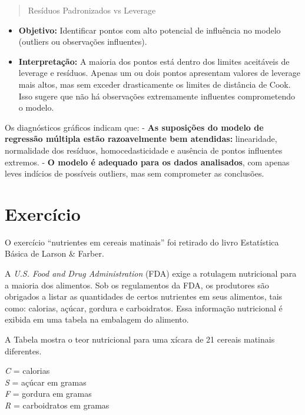 \documentclass[
]{book}
\providecommand{\tightlist}{%
  \setlength{\itemsep}{0pt}\setlength{\parskip}{0pt}}
\begin{document}
\begin{quote}
Resíduos Padronizados vs Leverage
\end{quote}

\begin{itemize}
\tightlist
\item
  \textbf{Objetivo:} Identificar pontos com alto potencial de influência no modelo (outliers ou observações influentes).
\item
  \textbf{Interpretação:} A maioria dos pontos está dentro dos limites aceitáveis de leverage e resíduos. Apenas um ou dois pontos apresentam valores de leverage mais altos, mas sem exceder drasticamente os limites de distância de Cook. Isso sugere que não há observações extremamente influentes comprometendo o modelo.
\end{itemize}

Os diagnósticos gráficos indicam que:
- \textbf{As suposições do modelo de regressão múltipla estão razoavelmente bem atendidas:} linearidade, normalidade dos resíduos, homocedasticidade e ausência de pontos influentes extremos.
- \textbf{O modelo é adequado para os dados analisados}, com apenas leves indícios de possíveis outliers, mas sem comprometer as conclusões.

\section{Exercício}\label{exercuxedcio}

O exercício ``nutrientes em cereais matinais'' foi retirado do livro Estatística Básica de Larson \& Farber.

A \emph{U.S. Food and Drug Administration} (FDA) exige a rotulagem nutricional para a maioria dos alimentos. Sob os regulamentos da FDA, os produtores são obrigados a listar as quantidades de certos nutrientes em seus alimentos, tais como: calorias, açúcar, gordura e carboidratos. Essa informação nutricional é exibida em uma tabela na embalagem do alimento.

A Tabela mostra o teor nutricional para uma xícara de 21 cereais matinais diferentes.

\emph{C} = calorias\\
\emph{S} = açúcar em gramas\\
\emph{F} = gordura em gramas\\
\emph{R} = carboidratos em gramas
\end{document}
